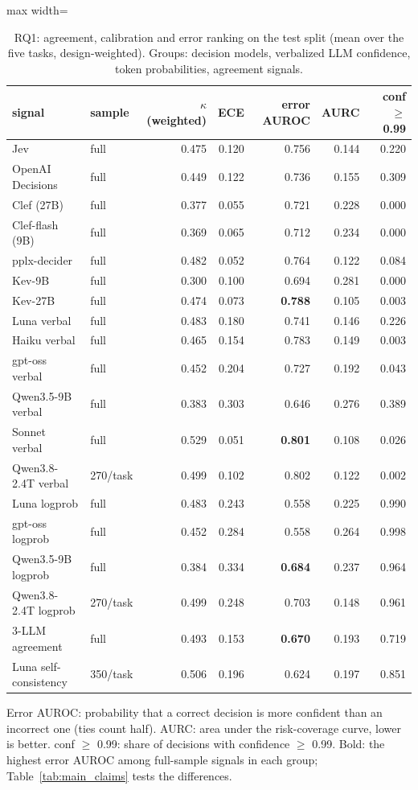 \begin{table}[t]
\centering
\small
\caption{RQ1: agreement, calibration and error ranking on the test split (mean over the five tasks, design-weighted). Groups: decision models, verbalized LLM confidence, token probabilities, agreement signals.}
\label{tab:main_rq1}
\begin{adjustbox}{max width=\linewidth}
\begin{tabular}{llrrrrr}
\toprule
signal & sample & $\kappa$ (weighted) & ECE & error AUROC & AURC & conf $\geq$ 0.99 \\
\midrule
Jev & full & 0.475 & 0.120 & 0.756 & 0.144 & 0.220 \\
OpenAI Decisions & full & 0.449 & 0.122 & 0.736 & 0.155 & 0.309 \\
Clef (27B) & full & 0.377 & 0.055 & 0.721 & 0.228 & 0.000 \\
Clef-flash (9B) & full & 0.369 & 0.065 & 0.712 & 0.234 & 0.000 \\
pplx-decider & full & 0.482 & 0.052 & 0.764 & 0.122 & 0.084 \\
Kev-9B & full & 0.300 & 0.100 & 0.694 & 0.281 & 0.000 \\
Kev-27B & full & 0.474 & 0.073 & \textbf{0.788} & 0.105 & 0.003 \\
\midrule
Luna verbal & full & 0.483 & 0.180 & 0.741 & 0.146 & 0.226 \\
Haiku verbal & full & 0.465 & 0.154 & 0.783 & 0.149 & 0.003 \\
gpt-oss verbal & full & 0.452 & 0.204 & 0.727 & 0.192 & 0.043 \\
Qwen3.5-9B verbal & full & 0.383 & 0.303 & 0.646 & 0.276 & 0.389 \\
Sonnet verbal & full & 0.529 & 0.051 & \textbf{0.801} & 0.108 & 0.026 \\
Qwen3.8-2.4T verbal & 270/task & 0.499 & 0.102 & 0.802 & 0.122 & 0.002 \\
\midrule
Luna logprob & full & 0.483 & 0.243 & 0.558 & 0.225 & 0.990 \\
gpt-oss logprob & full & 0.452 & 0.284 & 0.558 & 0.264 & 0.998 \\
Qwen3.5-9B logprob & full & 0.384 & 0.334 & \textbf{0.684} & 0.237 & 0.964 \\
Qwen3.8-2.4T logprob & 270/task & 0.499 & 0.248 & 0.703 & 0.148 & 0.961 \\
\midrule
3-LLM agreement & full & 0.493 & 0.153 & \textbf{0.670} & 0.193 & 0.719 \\
Luna self-consistency & 350/task & 0.506 & 0.196 & 0.624 & 0.197 & 0.851 \\
\bottomrule
\end{tabular}
\end{adjustbox}
\par\smallskip\footnotesize\raggedright Error AUROC: probability that a correct decision is more confident than an incorrect one (ties count half). AURC: area under the risk-coverage curve, lower is better. conf $\geq$ 0.99: share of decisions with confidence $\geq$ 0.99. Bold: the highest error AUROC among full-sample signals in each group; Table~\ref{tab:main_claims} tests the differences.
\end{table}
